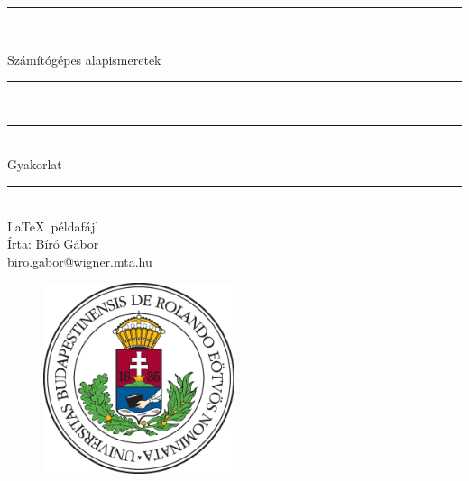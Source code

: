 \documentclass[a4paper, 12pt]{article}
\numberwithin{equation}{section}          %
\numberwithin{figure}{subsection}
\begin{document}
\begin{titlepage}   
\begin{center}
\thispagestyle{empty}  

\vspace*{0.7cm}
\rule{\linewidth}{0.5mm} \\[3mm]
\vspace*{0.7cm}

{\LARGE Számítógépes alapismeretek}

\vspace*{0.7cm}
\rule{\linewidth}{0.5mm} \\[3mm]
\rule{\linewidth}{0.5mm} \\[3mm]



{\Large Gyakorlat\\}

\vspace*{0.7cm}
\rule{\linewidth}{0.5mm} \\[3mm]
  {\small \LaTeX\ példafájl} \\[3mm]
  \vspace*{1cm}
{\footnotesize Írta: Bíró Gábor} \\
{\tiny biro.gabor@wigner.mta.hu}

  \vspace*{2cm}

\begin{figure}[h!]
\begin{center}
\includegraphics[width=0.5\textwidth]{img/elte}
\end{center}
\end{figure}

\end{center}
\end{titlepage}
\end{document}
